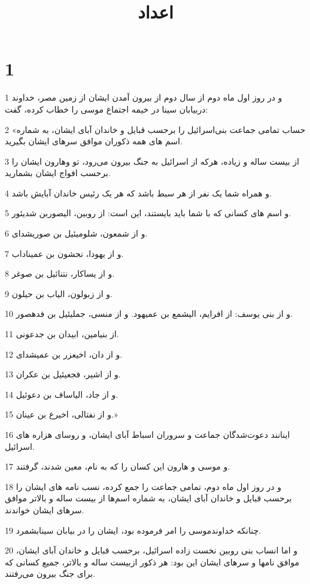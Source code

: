 

\title{اعداد}

 
\chapter{1}

\par 1 و در روز اول ماه دوم از سال دوم از بیرون آمدن ایشان از زمین مصر، خداوند دربیابان سینا در خیمه اجتماع موسی را خطاب کرده، گفت:
\par 2 «حساب تمامی جماعت بنی‌اسرائیل را برحسب قبایل و خاندان آبای ایشان، به شماره اسم های همه ذکوران موافق سرهای ایشان بگیرید.
\par 3 از بیست ساله و زیاده، هر‌که از اسرائیل به جنگ بیرون می‌رود، تو وهارون ایشان را برحسب افواج ایشان بشمارید.
\par 4 و همراه شما یک نفر از هر سبط باشد که هر یک رئیس خاندان آبایش باشد.
\par 5 و اسم های کسانی که با شما باید بایستند، این است: از روبین، الیصوربن شدیئور.
\par 6 و از شمعون، شلومیئیل بن صوریشدای.
\par 7 و از یهودا، نحشون بن عمیناداب.
\par 8 و از یساکار، نتنائیل بن صوغر.
\par 9 و از زبولون، الیاب بن حیلون.
\par 10 و از بنی یوسف: از افرایم، الیشمع بن عمیهود. و از منسی، جملیئیل بن فدهصور.
\par 11 از بنیامین، ابیدان بن جدعونی.
\par 12 و از دان، اخیعزر بن عمیشدای.
\par 13 و از اشیر، فجعیئیل بن عکران.
\par 14 و از جاد، الیاساف بن دعوئیل.
\par 15 و از نفتالی، اخیرع بن عینان.»
\par 16 اینانند دعوت‌شدگان جماعت و سروران اسباط آبای ایشان، و روسای هزاره های اسرائیل.
\par 17 و موسی و هارون این کسان را که به نام، معین شدند، گرفتند.
\par 18 و در روز اول ماه دوم، تمامی جماعت را جمع کرده، نسب نامه های ایشان را برحسب قبایل و خاندان آبای ایشان، به شماره اسم‌ها از بیست ساله و بالاتر موافق سرهای ایشان خواندند.
\par 19 چنانکه خداوندموسی را امر فرموده بود، ایشان را در بیابان سینابشمرد.
\par 20 و اما انساب بنی روبین نخست زاده اسرائیل، برحسب قبایل و خاندان آبای ایشان، موافق نامها و سرهای ایشان این بود: هر ذکور ازبیست ساله و بالاتر، جمیع کسانی که برای جنگ بیرون می‌رفتند.
